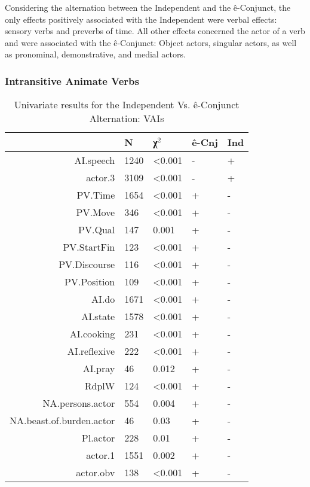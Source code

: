 Considering the alternation between the Independent and the ê-Conjunct, the only effects positively associated with the Independent were verbal effects: sensory verbs and preverbs of time. All other effects concerned the actor of a verb and were associated with the ê-Conjunct: Object actors, singular actors, as well as pronominal, demonstrative, and medial actors.
\FloatBarrier



\FloatBarrier

\subsubsection{Intransitive Animate Verbs}

\begin{table}[H]
  \centering
  \footnotesize
\begin{tabular}{rllll}
    \toprule
&N&χ$^{2}$&ê-Cnj&Ind\\
\midrule

AI.speech & 1240 & \textless{}0.001 & - & + \\
actor.3 & 3109 & \textless{}0.001 & - & + \\

PV.Time & 1654 & \textless{}0.001 & + & - \\
PV.Move & 346 & \textless{}0.001 & + & - \\
PV.Qual & 147 & 0.001 & + & - \\
PV.StartFin & 123 & \textless{}0.001 & + & - \\
PV.Discourse & 116 & \textless{}0.001 & + & - \\
PV.Position & 109 & \textless{}0.001 & + & - \\

AI.do & 1671 & \textless{}0.001 & + & - \\
AI.state & 1578 & \textless{}0.001 & + & - \\
AI.cooking & 231 & \textless{}0.001 & + & - \\
AI.reflexive & 222 & \textless{}0.001 & + & - \\
AI.pray & 46 & 0.012 & + & - \\
RdplW & 124 & \textless{}0.001 & + & - \\
NA.persons.actor & 554 & 0.004 & + & - \\
NA.beast.of.burden.actor & 46 & 0.03 & + & - \\
Pl.actor & 228 & 0.01 & + & - \\
actor.1 & 1551 & 0.002 & + & - \\
actor.obv & 138 & \textless{}0.001 & + & - \\

\bottomrule
  \end{tabular}
  \caption{
   Univariate results for the Independent Vs. ê-Conjunct Alternation: VAIs \\ \label{tab:aiiveuni}
  }
\end{table}

